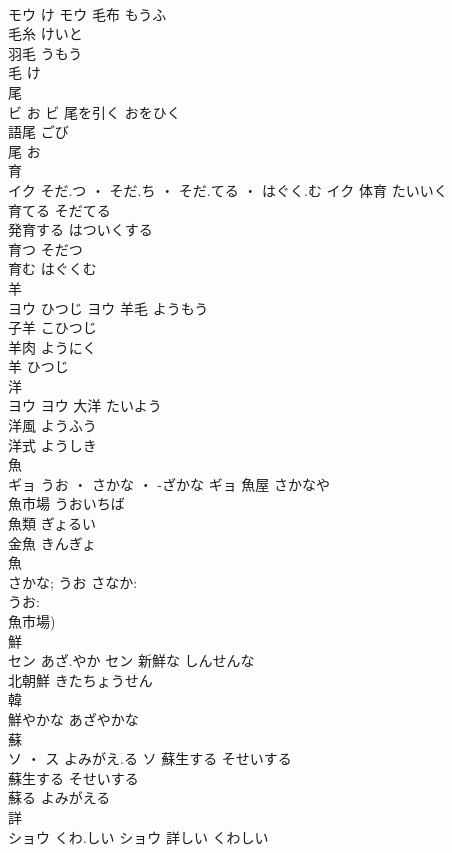 \documentclass[8pt]{extreport}
\begin{document}
\begin{CJK}{UTF8}{min}
\\	モウ	け	モウ	毛布	もうふ	
\\	毛糸	けいと	
\\	羽毛	うもう	
\\	毛	け	
\\	尾	
\\	ビ	お	ビ	尾を引く	おをひく	
\\	語尾	ごび	
\\	尾	お	
\\	育	
\\	イク	そだ.つ ・ そだ.ち ・ そだ.てる ・ はぐく.む	イク	体育	たいいく	
\\	育てる	そだてる	
\\	発育する	はついくする	
\\	育つ	そだつ	
\\	育む	はぐくむ	
\\	羊	
\\	ヨウ	ひつじ	ヨウ	羊毛	ようもう	
\\	子羊	こひつじ	
\\	羊肉	ようにく	
\\	羊	ひつじ	
\\	洋	
\\	ヨウ		ヨウ	大洋	たいよう	
\\	洋風	ようふう	
\\	洋式	ようしき	
\\	魚	
\\	ギョ	うお ・ さかな ・ -ざかな	ギョ	魚屋	さかなや	
\\	魚市場	うおいちば	
\\	魚類	ぎょるい	
\\	金魚	きんぎょ	
\\	魚 
\\	さかな; うお	さなか: 
\\	うお: 
\\	魚市場)																	
\\	鮮	
\\	セン	あざ.やか	セン	新鮮な	しんせんな	
\\	北朝鮮	きたちょうせん	
\\	韓 
\\	鮮やかな	あざやかな	
\\	蘇	
\\	ソ ・ ス	よみがえ.る	ソ	蘇生する	そせいする	
\\	蘇生する	そせいする	
\\	蘇る	よみがえる	
\\	詳	
\\	ショウ	くわ.しい	ショウ	詳しい	くわしい	

\end{CJK}
\end{document}
